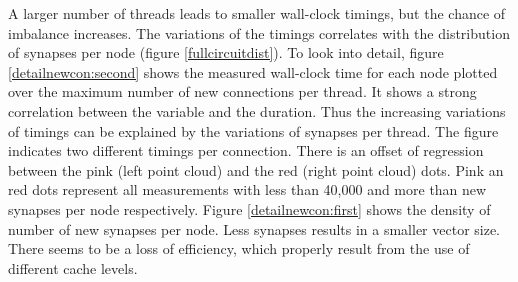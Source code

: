 A larger number of threads leads to smaller wall-clock timings, but the chance of imbalance increases.
The variations of the timings correlates with the distribution of synapses per node (figure \ref{fullcircuitdist}).
To look into detail, figure \ref{detailnewcon:second} shows the measured wall-clock time for each node
plotted over the maximum number of new connections per thread. It shows a strong correlation between the variable and
the duration. Thus the increasing variations of timings can be explained by the variations of synapses per thread.
The figure indicates two different timings per connection. There is an offset of regression between the pink
(left point cloud)
and the red (right point cloud) dots. Pink an red dots represent all measurements with less than 40,000 and more than new synapses per
node respectively. Figure \ref{detailnewcon:first} shows the density of number of new synapses per node.
Less synapses results in a smaller vector size. There seems to be a loss of efficiency, which properly result from
the use of different cache levels. 

